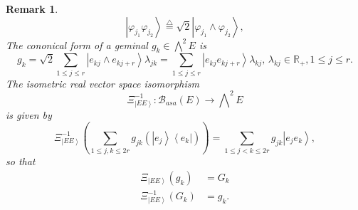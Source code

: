 \documentclass[aps,preprint]{revtex4}%
\newtheorem{remark}[theorem]{Remark}
\begin{document}
\begin{remark}%
\begin{equation}
\left\vert \varphi_{j_{1}}\varphi_{j_{2}}\right\rangle \overset{\bigtriangleup
}{=}\sqrt{2}\left\vert \varphi_{j_{1}}\wedge\varphi_{j_{2}}\right\rangle ,
\end{equation}
The cononical form of a geminal $g_{k}\in%
{\textstyle\bigwedge\nolimits^{2}}
E$ is
\begin{equation}
g_{k}=\sqrt{2}\sum_{1\leq j\leq r}\left\vert e_{kj}\wedge e_{kj+r}%
\right\rangle \lambda_{jk}=\sum_{1\leq j\leq r}\left\vert e_{kj}%
e_{kj+r}\right\rangle \lambda_{kj},\,\lambda_{kj}\in\mathbb{R}_{\boldsymbol{+}%
},1\leq j\leq r.
\end{equation}
The isometric real vector space isomorphism
\begin{equation}
\Xi_{\left\vert EE\right\rangle }^{-1}:\mathcal{B}_{asa}\left(  E\right)
\rightarrow%
{\textstyle\bigwedge\nolimits^{2}}
E
\end{equation}
is given by
\begin{equation}
\Xi_{\left\vert EE\right\rangle }^{-1}\left(  \sum_{1\leq j,k\leq2r}%
g_{jk}\left(  \left\vert e_{j}\right\rangle \left\langle e_{k}\right\vert
\right)  \right)  =\sum_{1\leq j<k\leq2r}g_{jk}\left\vert e_{j}e_{k}%
\right\rangle ,
\end{equation}
so that
\begin{align}
\Xi_{\left\vert EE\right\rangle }\left(  g_{k}\right)   &  =G_{k}\\
\Xi_{\left\vert EE\right\rangle }^{-1}\left(  G_{k}\right)   &  =g_{k}.
\end{align}

\end{remark}
\end{document}
